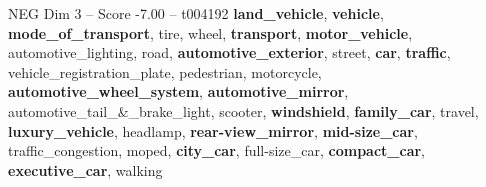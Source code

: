 \begin{textsample}{NEG Dim 3 – Score -7.00 – t004192}  \label{ex:f3_neg_013}
\textbf{land\_vehicle}, \textbf{vehicle}, \textbf{mode\_of\_transport}, tire, wheel, \textbf{transport}, \textbf{motor\_vehicle}, automotive\_lighting, road, \textbf{automotive\_exterior}, street, \textbf{car}, \textbf{traffic}, vehicle\_registration\_plate, pedestrian, motorcycle, \textbf{automotive\_wheel\_system}, \textbf{automotive\_mirror}, automotive\_tail\_\&\_brake\_light, scooter, \textbf{windshield}, \textbf{family\_car}, travel, \textbf{luxury\_vehicle}, headlamp, \textbf{rear-view\_mirror}, \textbf{mid-size\_car}, traffic\_congestion, moped, \textbf{city\_car}, full-size\_car, \textbf{compact\_car}, \textbf{executive\_car}, walking

\end{textsample}
